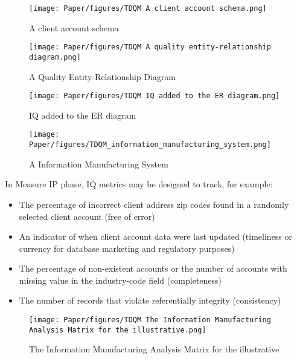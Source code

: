 \documentclass[pdftex,english,oribibl]{llncs}
\begin{document}
\begin{figure}
    \centering
    \texttt{[image: Paper/figures/TDQM A client account schema.png]}
    \caption{A client account schema}
    \label{fig:AccountSchema}
 \end{figure}



\begin{figure}
    \centering
    \texttt{[image: Paper/figures/TDQM A quality entity-relationship diagram.png]}
    \caption{A Quality Entity-Relationship Diagram}
    \label{fig:Quality Entity-Relationship Diagram}
 \end{figure}


\begin{figure}
    \centering
    \texttt{[image: Paper/figures/TDQM IQ added to the ER diagram.png]}
    \caption{IQ added to the ER diagram}
    \label{fig:IQ added to the ER diagram}
 \end{figure}


\begin{figure}
    \centering
    \texttt{[image: Paper/figures/TDQM\_information\_manufacturing\_system.png]}
    \caption{A Information Manufacturing System}
    \label{fig:InformationManufacturingSystem}
 \end{figure}

In Measure IP phase, IQ metrics may be designed to track, for example:
\begin{itemize}
    \item The percentage of incorrect client address zip codes
found in a randomly selected client account (free of
error)
    \item An indicator of when client account data were last
updated (timeliness or currency for database marketing and regulatory purposes)
    \item The percentage of non-existent accounts or the
number of accounts with missing value in the
industry-code field (completeness)
    \item The number of records that violate referentially
integrity (consistency)
\end{itemize}

\begin{figure}
    \centering
    \texttt{[image: Paper/figures/TDQM The Information Manufacturing Analysis Matrix for the illustrative.png]}
    \caption{The Information Manufacturing Analysis Matrix for the illustrative}
    \label{fig:Information Manufacturing Analysis Matrix}
 \end{figure}
\end{document}
